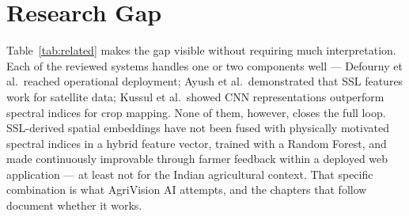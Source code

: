 \documentclass[12pt,a4paper,oneside]{report}
\begin{document}
\begin{table}[h]
\centering
\caption{Comparison of AgriVision AI with closely related systems.}
\label{tab:related}
\end{table}

\section{Research Gap}

Table~\ref{tab:related} makes the gap visible without requiring much interpretation. Each of the reviewed systems handles one or two components well — Defourny et al.\ reached operational deployment; Ayush et al.\ demonstrated that SSL features work for satellite data; Kussul et al.\ showed CNN representations outperform spectral indices for crop mapping. None of them, however, closes the full loop. SSL-derived spatial embeddings have not been fused with physically motivated spectral indices in a hybrid feature vector, trained with a Random Forest, and made continuously improvable through farmer feedback within a deployed web application — at least not for the Indian agricultural context. That specific combination is what AgriVision AI attempts, and the chapters that follow document whether it works.
\end{document}
